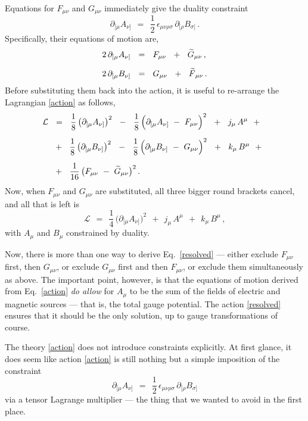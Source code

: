 \documentclass[epsfig,12pt]{article}
\def\beq{\begin{equation}}
\def\eeq{\end{equation}}
\newcommand{\cell}{{\mathcal L}}
\newcommand{\p}{\partial}
\newcommand{\wt}{\widetilde}
\begin{document}
	Equations for $ F_{\mu\nu} $ and $ G_{\mu\nu} $ immediately give the duality constraint
\beq
	\p_{[\mu} A_{\nu]}    ~~=~~    \frac{1}{2}\,\epsilon_{\mu\nu\rho\sigma}\, \p_{[\rho} B_{\sigma]}\,.
\eeq
	Specifically, their equations of motion are,
\begin{align}
%
\notag
	2\, \p_{[\mu} A_{\nu]}    & ~~=~~    F_{\mu\nu}  ~~+~~  \wt G{}_{\mu\nu}\,,
	\\[2mm]
%
\label{eq-motion}
	2\, \p_{[\mu} B_{\nu]}    & ~~=~~    G_{\mu\nu}  ~~+~~  \wt F{}_{\mu\nu}\,.
\end{align}
	Before substituting them back into the action, it is useful to re-arrange the Lagrangian \eqref{action} as follows,
\begin{align}
%
\notag
	\cell    & ~~=~~    \frac{1}{8}\, \big( \p_{[\mu} A_{\nu]} \big)^2  ~~-~~  
			    \frac{1}{8}\, \Big( \p_{[\mu} A_{\nu]} ~-~ F_{\mu\nu} \Big)^2  ~~+~~  j_\mu\, A^\mu  ~~+~~
	\\[2mm]
%
	&
		   ~~+~~    \frac{1}{8}\, \big( \p_{[\mu} B_{\nu]} \big)^2  ~~-~~
			    \frac{1}{8}\, \Big( \p_{[\mu} B_{\nu]} ~-~ G_{\mu\nu} \Big)^2  ~~+~~  k_\mu\, B^\mu  ~~+~~
	\\[2mm]
%
\notag
	&
	           ~~+~~    \frac{1}{16}\, \big( F_{\mu\nu} ~-~ \wt G{}_{\mu\nu} \big)^2\,.
\end{align}
	Now, when $ F_{\mu\nu} $ and $ G_{\mu\nu} $ are substituted, 
	all three bigger round brackets cancel,
	and all that is left is
\beq
\label{resolved}
	\cell    ~~=~~    \frac{1}{4}\, \big( \p_{[\mu} A_{\nu]} \big)^2  ~~+~~  j_\mu\, A^\mu    ~~+~~  k_\mu\, B^\mu\,,
\eeq
	with $ A_\mu $ and $ B_\mu $ constrained by duality.


\pagebreak
	Now, there is more than one way to derive Eq.~\eqref{resolved} --- either exclude $ F_{\mu\nu} $ first, then $ G_{\mu\nu} $,
	or exclude $ G_{\mu\nu} $ first and then $ F_{\mu\nu} $, or exclude them simultaneously as above. 
	The important point, however, is that the equations of motion derived from Eq.~\eqref{action} {\it do allow} 
	for $ A_\mu $ to be the sum of the fields of electric and magnetic sources --- that is, the total gauge potential.
	The action \eqref{resolved} ensures that it should be the only solution, up to gauge transformations of course.

	The theory \eqref{action} does not introduce constraints explicitly.
	At first glance, it does seem like action \eqref{action} is still nothing but a simple imposition of the constraint
\[
	\p_{[\mu} A_{\nu]}    ~~=~~    \frac{1}{2}\,\epsilon_{\mu\nu\rho\sigma}\, \p_{[\rho} B_{\sigma]}
\]
	via a tensor Lagrange multiplier --- the thing that we wanted to avoid in the first place.
	
\end{document}

